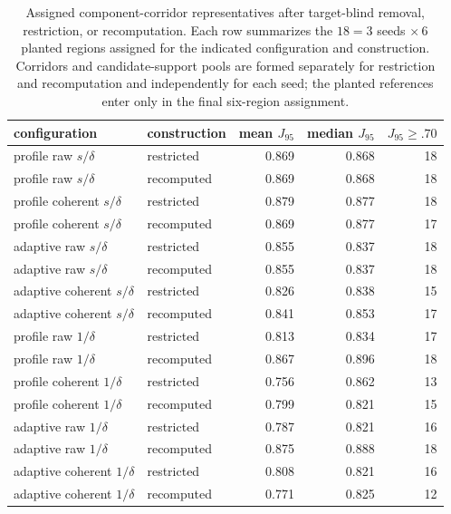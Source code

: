 \documentclass[a4paper,11pt]{article}
\theoremstyle{definition}
\theoremstyle{remark}
\begin{document}
\begin{table}[!ht]
\centering
\small
\caption{Assigned component-corridor representatives after target-blind removal, restriction, or recomputation. Each row summarizes the $18=3$ seeds $\times\,6$ planted regions assigned for the indicated configuration and construction. Corridors and candidate-support pools are formed separately for restriction and recomputation and independently for each seed; the planted references enter only in the final six-region assignment.}
\label{tab:mixed-bumps-component-corridors}
\setlength{\tabcolsep}{5.0pt}
\begin{tabular}{@{}llrrr@{}}
\toprule
configuration & construction & mean $J_{95}$ & median $J_{95}$ & $J_{95}\geq .70$ \\
\midrule
profile raw $s/\delta$ & restricted & 0.869 & 0.868 & 18 \\
profile raw $s/\delta$ & recomputed & 0.869 & 0.868 & 18 \\
profile coherent $s/\delta$ & restricted & 0.879 & 0.877 & 18 \\
profile coherent $s/\delta$ & recomputed & 0.869 & 0.877 & 17 \\
adaptive raw $s/\delta$ & restricted & 0.855 & 0.837 & 18 \\
adaptive raw $s/\delta$ & recomputed & 0.855 & 0.837 & 18 \\
adaptive coherent $s/\delta$ & restricted & 0.826 & 0.838 & 15 \\
adaptive coherent $s/\delta$ & recomputed & 0.841 & 0.853 & 17 \\
profile raw $1/\delta$ & restricted & 0.813 & 0.834 & 17 \\
profile raw $1/\delta$ & recomputed & 0.867 & 0.896 & 18 \\
profile coherent $1/\delta$ & restricted & 0.756 & 0.862 & 13 \\
profile coherent $1/\delta$ & recomputed & 0.799 & 0.821 & 15 \\
adaptive raw $1/\delta$ & restricted & 0.787 & 0.821 & 16 \\
adaptive raw $1/\delta$ & recomputed & 0.875 & 0.888 & 18 \\
adaptive coherent $1/\delta$ & restricted & 0.808 & 0.821 & 16 \\
adaptive coherent $1/\delta$ & recomputed & 0.771 & 0.825 & 12 \\
\bottomrule
\end{tabular}
\end{table}
\end{document}
